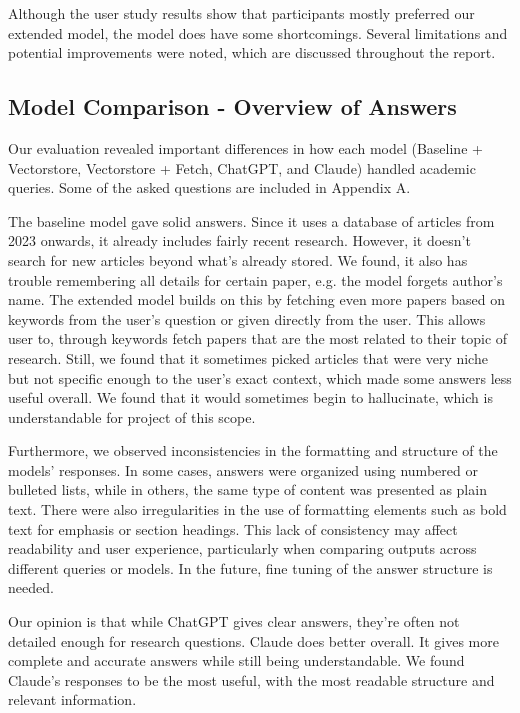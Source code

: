 \documentclass[fleqn,moreauthors,10pt]{ds_report}
\begin{document}
Although the user study results show that participants mostly preferred our extended model, the model does have some shortcomings. Several limitations and potential improvements were noted, which are discussed throughout the report.

\subsection*{Model Comparison - Overview of Answers}

Our evaluation revealed important differences in how each model (Baseline + Vectorstore, Vectorstore + Fetch, ChatGPT, and Claude) handled academic queries. Some of the asked questions are included in Appendix A.

The baseline model gave solid answers. Since it uses a database of articles from 2023 onwards, it already includes fairly recent research. However, it doesn’t search for new articles beyond what’s already stored. We found, it also has trouble remembering all details for certain paper, e.g. the model forgets author's name. The extended model builds on this by fetching even more papers based on keywords from the user's question or given directly from the user. This allows user to, through keywords fetch papers that are the most related to their topic of research. Still, we found that it sometimes picked articles that were very niche but not specific enough to the user's exact context, which made some answers less useful overall. We found that it would sometimes begin to hallucinate, which is understandable for project of this scope.

Furthermore, we observed inconsistencies in the formatting and structure of the models’ responses. In some cases, answers were organized using numbered or bulleted lists, while in others, the same type of content was presented as plain text. There were also irregularities in the use of formatting elements such as bold text for emphasis or section headings. This lack of consistency may affect readability and user experience, particularly when comparing outputs across different queries or models. In the future, fine tuning of the answer structure is needed.

Our opinion is that while ChatGPT gives clear answers, they're often not detailed enough for research questions. Claude does better overall. It gives more complete and accurate answers while still being understandable. We found Claude's responses to be the most useful, with the most readable structure and relevant information.
\end{document}
